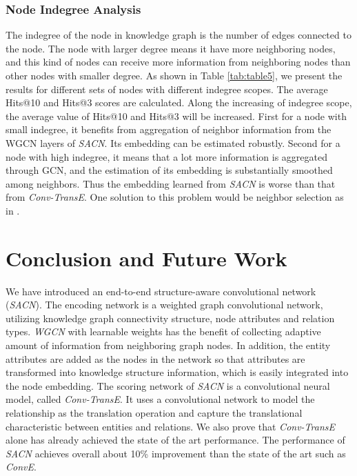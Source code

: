 \documentclass[letterpaper]{article} \usepackage{aaai19}  \usepackage{times}  \usepackage{helvet}  \usepackage{courier}  \usepackage{url}  \usepackage{graphicx}  \usepackage{amsmath}
\begin{document}
\subsubsection{Node Indegree Analysis}
The indegree of the node in knowledge graph is the number of edges connected to the node. The node with larger degree means it have more neighboring nodes, and this kind of nodes can receive more information from neighboring nodes than other nodes with smaller degree. As shown in Table \ref{tab:table5}, we present the results for different sets of nodes with different indegree scopes. The average Hits@10 and Hits@3 scores are calculated. Along the increasing of indegree scope, the average value of Hits@10 and Hits@3 will be increased. 
First for a node with small indegree, it benefits from aggregation of neighbor information from the WGCN layers of {\it SACN}. Its embedding can be estimated robustly. Second for a node with high indegree, it means that a lot more information is aggregated through GCN, and the estimation of its embedding is substantially smoothed among neighbors. Thus the embedding learned from {\it SACN} is worse than that from {\it Conv-TransE}. One solution to this problem would be neighbor selection as in \cite{ying2018kdd}.



\section{Conclusion and Future Work}

We have introduced an end-to-end structure-aware convolutional network ({\it SACN}).
The encoding network is a weighted graph convolutional network, utilizing knowledge graph connectivity structure, node attributes and relation types. {\it WGCN} with learnable weights has the benefit of collecting adaptive amount of information from neighboring graph nodes. In addition, the entity attributes are added as the nodes in the network so that attributes are transformed into knowledge structure information, which is easily integrated into the node embedding. 
The scoring network of {\it SACN} is a convolutional neural model, called {\it Conv-TransE}. It uses a convolutional network to model the relationship as the translation operation and capture the translational characteristic between entities and relations. We also prove that {\it Conv-TransE} alone has already achieved the state of the art performance. The performance of {\it SACN} achieves overall about 10\% improvement than the state of the art such as {\it ConvE}.
\end{document}
